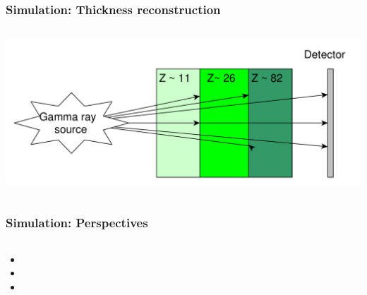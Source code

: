 \documentclass[11pt]{beamer}
\begin{document}
    \begin{frame}
    \frametitle{Simulation: Thickness reconstruction}
    \begin{columns}
        \begin{column}{1\textwidth} 
            \includegraphics[width=1\textwidth]{figures/yed_schema_2.pdf}
        \end{column}
    \end{columns}  
\end{frame}

    \begin{frame}
    \frametitle{Simulation: Perspectives}
    \begin{columns}
                \begin{column}{0.6\textwidth}
                    \begin{itemize}
                        \item 
                        \item 
                        \item 
                        
                    \end{itemize}
                \end{column}
    \end{columns}  
\end{frame}
\end{document}
